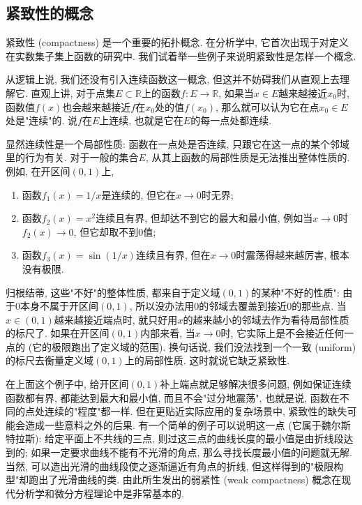 

\subsection{紧致性的概念}
紧致性 (compactness) 是一个重要的拓扑概念. 在分析学中, 它首次出现于对定义在实数集子集上函数的研究中. 我们试着举一些例子来说明紧致性是怎样一个概念.

从逻辑上说, 我们还没有引入连续函数这一概念, 但这并不妨碍我们从直观上去理解它. 直观上讲, 对于点集$E\subset\mathbb{R}$上的函数$f:E\to\mathbb{R}$, 如果当$x\in E$越来越接近$x_0$时, 函数值$f(x)$也会越来越接近$f$在$x_0$处的值$f(x_0)$, 那么就可以认为它在点$x_0\in E$处是"连续"的. 说$f$在$E$上连续, 也就是它在$E$的每一点处都连续. 

显然连续性是一个局部性质: 函数在一点处是否连续, 只跟它在这一点的某个邻域里的行为有关. 对于一般的集合$E$, 从其上函数的局部性质是无法推出整体性质的. 例如, 在开区间$(0,1)$上,

\begin{enumerate}
\item 函数$f_1(x)=1/x$是连续的, 但它在$x\to0$时无界; 
\item 函数$f_2(x)=x^2$连续且有界, 但却达不到它的最大和最小值, 例如当$x\to0$时$f_2(x)\to0$, 但它却取不到$0$值; 
\item 函数$f_3(x)=\sin(1/x)$连续且有界, 但在$x\to0$时震荡得越来越厉害, 根本没有极限. 
\end{enumerate}

归根结蒂, 这些"不好"的整体性质, 都来自于定义域$(0,1)$的某种"不好的性质": 由于$0$本身不属于开区间$(0,1)$, 所以没办法用$0$的邻域去覆盖到接近$0$的那些点. 当$x\in(0,1)$越来越接近端点时, 就只好用$x$的越来越小的邻域去作为看待局部性质的标尺了. 如果在开区间$(0,1)$内部来看, 当$x\to0$时, 它实际上是不会接近任何一点的 (它的极限跑出了定义域的范围). 换句话说, 我们没法找到一个一致 (uniform) 的标尺去衡量定义域$(0,1)$上的局部性质. 这时就说它缺乏紧致性. 

在上面这个例子中, 给开区间$(0,1)$补上端点就足够解决很多问题, 例如保证连续函数都有界, 都能达到最大和最小值, 而且不会"过分地震荡", 也就是说, 函数在不同的点处连续的"程度"都一样. 但在更贴近实际应用的复杂场景中, 紧致性的缺失可能会造成一些意料之外的后果. 有一个简单的例子可以说明这一点 (它属于魏尔斯特拉斯): 给定平面上不共线的三点, 则过这三点的曲线长度的最小值是由折线段达到的; 如果一定要求曲线不能有不光滑的角点, 那么寻找长度最小值的问题就无解. 当然, 可以造出光滑的曲线段使之逐渐逼近有角点的折线, 但这样得到的"极限构型"却跑出了光滑曲线的类. 由此所生发出的弱紧性 (weak compactness) 概念在现代分析学和微分方程理论中是非常基本的.

